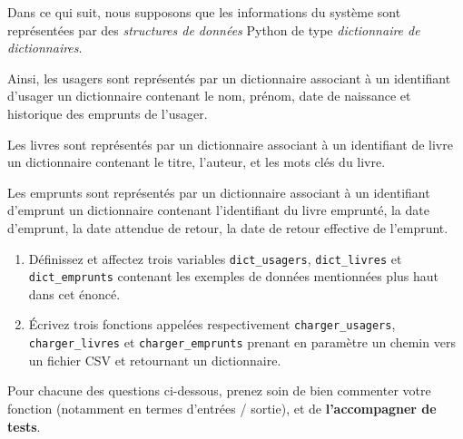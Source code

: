 \documentclass[10pt,a4paper]{sujets-exercices}
\begin{document}
Dans ce qui suit, nous supposons que les informations du système sont représentées par des \emph{structures de données} Python de type \emph{dictionnaire de dictionnaires}.

Ainsi, les usagers sont représentés par un dictionnaire associant à un identifiant d'usager un dictionnaire contenant le nom, prénom, date de naissance et historique des emprunts de l'usager.

Les livres sont représentés par un dictionnaire associant à un identifiant de livre un dictionnaire contenant le titre, l'auteur, et les mots clés du livre.

Les emprunts sont représentés par un dictionnaire associant à un identifiant d'emprunt un dictionnaire contenant l'identifiant du livre emprunté, la date d'emprunt, la date attendue de retour, la date de retour effective de l'emprunt.

\begin{enumerate}
\item Définissez et affectez trois variables \texttt{dict\_usagers}, \texttt{dict\_livres} et \texttt{dict\_emprunts} contenant les exemples de données mentionnées plus haut dans cet énoncé.
\item Écrivez trois fonctions appelées respectivement \texttt{charger\_usagers}, \texttt{charger\_livres} et \texttt{charger\_emprunts} prenant en paramètre un chemin vers un fichier CSV et retournant un dictionnaire.
\end{enumerate}


Pour chacune des questions ci-dessous, prenez soin de bien commenter votre fonction (notamment en termes d'entrées / sortie), et de \textbf{l'accompagner de tests}.
\end{document}

